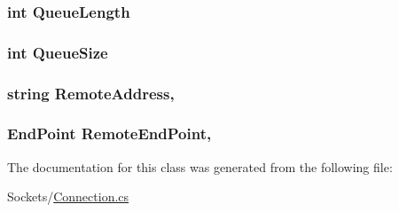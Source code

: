 \subsubsection[{Queue\+Length}]{\setlength{\rightskip}{0pt plus 5cm}int Queue\+Length\hspace{0.3cm}{\ttfamily [get]}}\label{classOTA_1_1Sockets_1_1Connection_a6877a4159f76ae1f48bddf93e81d8d64}
\hypertarget{classOTA_1_1Sockets_1_1Connection_a11bbffcd9c01d0abd3a238c3038e1ae0}{}
\subsubsection[{Queue\+Size}]{\setlength{\rightskip}{0pt plus 5cm}int Queue\+Size\hspace{0.3cm}{\ttfamily [get]}}\label{classOTA_1_1Sockets_1_1Connection_a11bbffcd9c01d0abd3a238c3038e1ae0}
\hypertarget{classOTA_1_1Sockets_1_1Connection_a5b3fbccddb2ac7b5856c0cb3a6a6e60c}{}
\subsubsection[{Remote\+Address}]{\setlength{\rightskip}{0pt plus 5cm}string Remote\+Address\hspace{0.3cm}{\ttfamily [get]}, {}}\label{classOTA_1_1Sockets_1_1Connection_a5b3fbccddb2ac7b5856c0cb3a6a6e60c}
\hypertarget{classOTA_1_1Sockets_1_1Connection_a0b05515289b04cf1de67b7d1f8863b94}{}
\subsubsection[{Remote\+End\+Point}]{\setlength{\rightskip}{0pt plus 5cm}End\+Point Remote\+End\+Point\hspace{0.3cm}{\ttfamily [get]}, {}}\label{classOTA_1_1Sockets_1_1Connection_a0b05515289b04cf1de67b7d1f8863b94}


The documentation for this class was generated from the following file\+:\begin{DoxyCompactItemize}
\item 
Sockets/\hyperlink{Connection_8cs}{Connection.\+cs}\end{DoxyCompactItemize}
